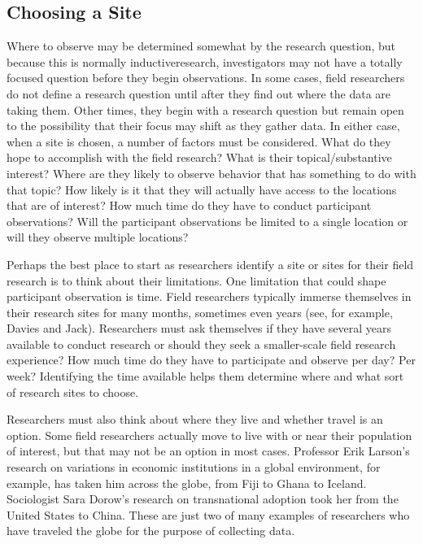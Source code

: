 \subsection{Choosing a Site}

Where to observe may be determined somewhat by the research question, but because this is normally \gls{inductiveresearch}, investigators may not have a totally focused question before they begin observations. In some cases, field researchers do not define a research question until after they find out where the data are taking them. Other times, they begin with a research question but remain open to the possibility that their focus may shift as they gather data. In either case, when a site is chosen, a number of factors must be considered. What do they hope to accomplish with the field research? What is their topical/substantive interest? Where are they likely to observe behavior that has something to do with that topic? How likely is it that they will actually have access to the locations that are of interest? How much time do they have to conduct participant observations? Will the participant observations be limited to a single location or will they observe multiple locations?

Perhaps the best place to start as researchers identify a site or sites for their field research is to think about their limitations. One limitation that could shape participant observation is time. Field researchers typically immerse themselves in their research sites for many months, sometimes even years (see, for example, Davies\cite{davies2010corporate} and Jack\cite{jack2010entrepreneurial}). Researchers must ask themselves if they have several years available to conduct research or should they seek a smaller-scale field research experience? How much time do they have to participate and observe per day? Per week? Identifying the time available helps them determine where and what sort of research sites to choose.

Researchers must also think about where they live and whether travel is an option. Some field researchers actually move to live with or near their population of interest, but that may not be an option in most cases. Professor Erik Larson's research on variations in economic institutions in a global environment, for example, has taken him across the globe, from Fiji to Ghana to Iceland\cite{larson2010time}. Sociologist Sara Dorow's research on transnational adoption took her from the United States to China\cite{dorow2006racialized}. These are just two of many examples of researchers who have traveled the globe for the purpose of collecting data. 

